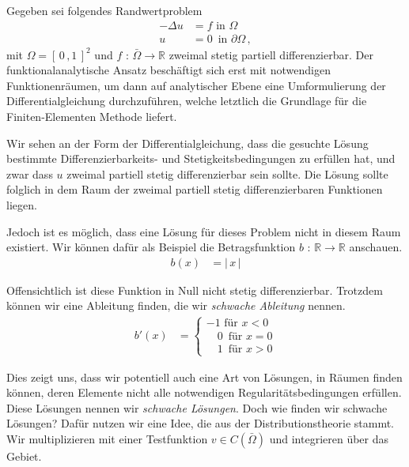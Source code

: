 Gegeben sei folgendes Randwertproblem
\begin{equation} \label{eq:dg}
\begin{aligned}
	- \Delta u &= f \text{ in } \Omega \\
	u &= 0 \, \text{ in } \partial \Omega \, ,
\end{aligned}
\end{equation}
mit $\Omega = [ \, 0 \, ,1 \, ]^{2}$ und $f$ : $\bar{\Omega} \rightarrow \mathbb{R}$ zweimal stetig partiell differenzierbar.
Der funktionalanalytische Ansatz beschäftigt sich erst mit notwendigen Funktionenräumen, um dann auf analytischer Ebene eine Umformulierung der Differentialgleichung durchzuführen, welche letztlich die Grundlage für die Finiten-Elementen Methode liefert.

Wir sehen an der Form der Differentialgleichung, dass die gesuchte Lösung bestimmte Differenzierbarkeits- und Stetigkeitsbedingungen zu erfüllen hat, und zwar dass $u$ zweimal partiell stetig differenzierbar sein sollte. Die Lösung sollte folglich in dem Raum der zweimal partiell stetig differenzierbaren Funktionen liegen.

Jedoch ist es möglich, dass eine Lösung für dieses Problem nicht in diesem Raum existiert. Wir können dafür als Beispiel die Betragsfunktion $b$ : $\mathbb{R} \rightarrow \mathbb{R}$ anschauen.
\begin{equation}
\begin{aligned}
b(x) &= | \, x \, |
\end{aligned}
\end{equation}

Offensichtlich ist diese Funktion in Null nicht stetig differenzierbar. Trotzdem können wir eine Ableitung finden, die wir \textit{schwache Ableitung} nennen. 
\begin{equation}
\begin{aligned}
b'(x) &= 
\begin{cases}
-1 \text{ für } x < 0 \\
\, \, \text{  }0 \, \text{ für } x = 0  \\
\, \, \text{  }1 \, \text{ für } x > 0 
\end{cases}
\end{aligned}
\end{equation}

Dies zeigt uns, dass wir potentiell auch eine Art von Lösungen, in Räumen finden können, deren Elemente nicht alle notwendigen Regularitätsbedingungen erfüllen. Diese Lösungen nennen wir \textit{schwache Lösungen}. Doch wie finden wir schwache Lösungen?
Dafür nutzen wir eine Idee, die aus der Distributionstheorie stammt.
Wir multiplizieren mit einer Testfunktion $v \in C(\bar{\Omega})$  und integrieren über das Gebiet.

